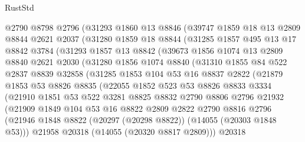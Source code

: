 \begin{lexlean}{RustStd}
\begin{coremodule}
    @2790
    @8798
    @2796
    (@31293
      @1860
      @13
      @8846
      (@39747
        @1859
        @18
        @13
        @2809
        @8844
        @2621
        @2037
        (@31280
          @1859
          @18
          @8844
          (@31285
            @1857
            @495
            @13
            @17
            @8842
            @3784
            (@31293
              @1857
              @13
              @8842
              (@39673
                @1856
                @1074
                @13
                @2809
                @8840
                @2621
                @2030
                (@31280
                  @1856
                  @1074
                  @8840
                  (@31310
                    @1855
                    @84
                    @522
                    @2837
                    @8839
                    @32858
                    (@31285
                      @1853
                      @104
                      @53
                      @16
                      @8837
                      @2822
                      (@21879
                        @1853
                        @53
                        @8826
                        @8835
                        (@22055
                          @1852
                          @523
                          @53
                          @8826
                          @8833
                          @3334
                          (@21910
                            @1851
                            @53
                            @522
                            @3281
                            @8825
                            @8832
                            @2790
                            @8806
                            @2796
                            @21932
                            (@21909
                              @1849
                              @104
                              @53
                              @16
                              @8822
                              @2809
                              @2822
                              @2790
                              @8816
                              @2796
                              (@21946
                                @1848
                                @8822
                                (@20297 (@20298 @8822))
                                (@14055 (@20303 @1848 @53)))
                              @21958
                              @20318
                              (@14055 (@20320 @8817 @2809)))
                            @20318

\end{coremodule}
\end{lexlean}
